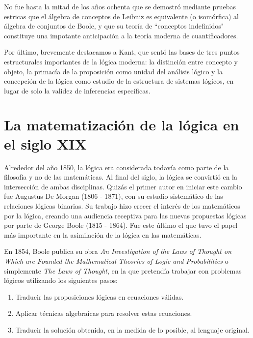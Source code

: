 \documentclass{article}
\begin{document}
No fue hasta la mitad de los años ochenta que se demostró mediante pruebas estricas que el álgebra de conceptos de Leibniz es equivalente (o isomórfica) al álgebra de conjuntos de Boole, y que su teoría de ``conceptos indefinidos" constituye una impotante anticipación a la teoría moderna de cuantificadores\cite{lenzen2004leibniz}.

Por último, brevemente destacamos a Kant, que sentó las bases de tres puntos estructurales importantes de la lógica moderna: la distinción entre concepto y objeto, la primacía de la proposición como unidad del análisis lógico y la concepción de la lógica como estudio de la estructura de sistemas lógicos, en lugar de solo la validez de inferencias específicas\cite{tiles2004kant}.

\section{La matematización de la lógica en el siglo XIX}

Alrededor del año 1850, la lógica era considerada todavía como parte de la filosofía y no de las matemáticas. Al final del siglo, la lógica se convirtió en la intersección de ambas disciplinas. Quizás el primer autor en iniciar este cambio fue Augustus De Morgan (1806 - 1871), con su estudio sistemático de las relaciones lógicas binarias. Su trabajo hizo crecer el interés de los matemáticos por la lógica, creando una audiencia receptiva para las nuevas propuestas lógicas por parte de George Boole (1815 - 1864). Fue este último el que tuvo el papel más importante en la asimilación de la lógica en las matemáticas\cite{sanchez2004algebra}.

En 1854, Boole publica su obra \textit{An Investigation of the Laws of Thought on Which are Founded the Mathematical Theories of Logic and Probabilities} o simplemente \textit{The Laws of Thought}\cite{blackburn2005oxford}, en la que pretendía trabajar con problemas lógicos utilizando los siguientes pasos:

\begin{enumerate}
    \item Traducir las proposiciones lógicas en ecuaciones válidas.
    \item Aplicar técnicas algebraicas para resolver estas ecuaciones.
    \item Traducir la solución obtenida, en la medida de lo posible, al lenguaje original\cite{sanchez2004algebra}.
\end{enumerate}
\end{document}
